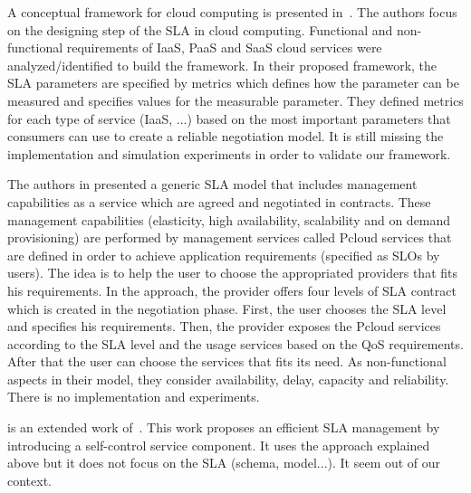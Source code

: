 \documentclass[12pt,a4paper,oneside]{article}
\begin{document}
\bigskip
A conceptual framework for cloud computing is presented in~\cite{005}. The authors focus on the designing step of the SLA in cloud computing. Functional and non-functional requirements of IaaS, PaaS and SaaS cloud services were analyzed/identified to build the framework. In their proposed framework, the SLA parameters are specified by metrics which defines how the parameter can be measured and specifies values for the measurable parameter. They defined metrics for each type of service (IaaS, ...) based on the most important parameters that consumers can use to create a reliable negotiation model. It is still missing the implementation and simulation experiments in order to validate our framework.

\bigskip
The authors in \cite{009} presented a generic SLA model that includes management capabilities as a service which are agreed and negotiated in contracts. These management capabilities (elasticity, high availability, scalability and on demand provisioning) are performed by management services called Pcloud services that are defined in order to achieve application requirements (specified as SLOs by users). The idea is to help the user to choose the appropriated providers that fits his requirements. In the approach, the provider offers four levels of SLA contract which is created in the negotiation phase. First, the user chooses the SLA level and specifies his requirements. Then, the provider exposes the Pcloud services according to the SLA level and the usage services based on the QoS requirements. After that the user can choose the services that fits its need. As non-functional aspects in their model, they consider availability, delay, capacity and reliability. There is no implementation and experiments.

\bigskip
\cite{008} is an extended work of~\cite{009}. This work proposes an efficient SLA management by introducing a self-control service component. It uses the approach explained above but it does not focus on the SLA (schema, model...). It seem out of our context.
\end{document}
